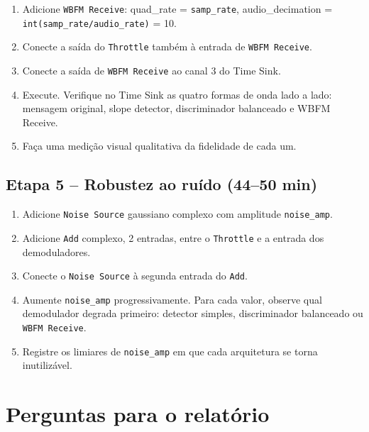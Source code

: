 \documentclass[11pt,a4paper]{article}
\begin{document}
\begin{instrucao}
\begin{enumerate}[label=\arabic*.]
  \item Adicione \texttt{WBFM Receive}: quad\_rate = \texttt{samp\_rate},
    audio\_decimation = \texttt{int(samp\_rate/audio\_rate)} = 10.
  \item Conecte a saída do \texttt{Throttle} também à entrada de
    \texttt{WBFM Receive}.
  \item Conecte a saída de \texttt{WBFM Receive} ao canal 3 do Time Sink.
  \item Execute. Verifique no Time Sink as quatro formas de onda lado a lado:
    mensagem original, slope detector, discriminador balanceado e WBFM Receive.
  \item Faça uma medição visual qualitativa da fidelidade de cada um.
\end{enumerate}
\end{instrucao}

\subsection*{Etapa 5 -- Robustez ao ruído (44--50 min)}

\begin{instrucao}
\begin{enumerate}[label=\arabic*.]
  \item Adicione \texttt{Noise Source} gaussiano complexo com amplitude
    \texttt{noise\_amp}.
  \item Adicione \texttt{Add} complexo, 2 entradas, entre o \texttt{Throttle}
    e a entrada dos demoduladores.
  \item Conecte o \texttt{Noise Source} à segunda entrada do \texttt{Add}.
  \item Aumente \texttt{noise\_amp} progressivamente. Para cada valor,
    observe qual demodulador degrada primeiro: detector simples,
    discriminador balanceado ou \texttt{WBFM Receive}.
  \item Registre os limiares de \texttt{noise\_amp} em que cada arquitetura
    se torna inutilizável.
\end{enumerate}
\end{instrucao}

\section{Perguntas para o relatório}
\end{document}
